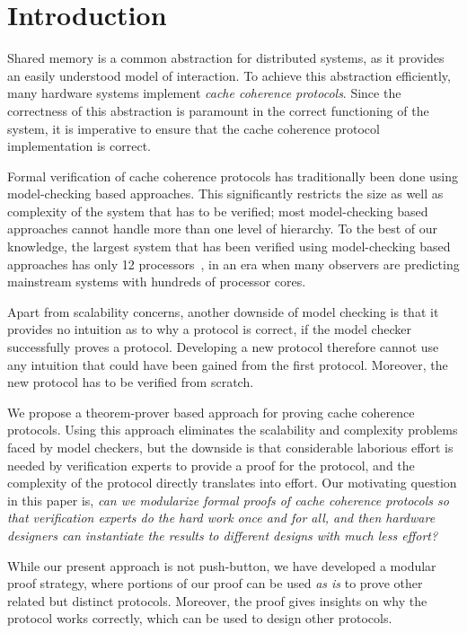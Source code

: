 \section{Introduction}
\label{sec:Introduction}

Shared memory is a common abstraction for distributed systems, as it provides
an easily understood model of interaction. To achieve this abstraction
efficiently, many hardware systems implement \emph{cache coherence protocols}.
Since the correctness of this abstraction is paramount in the correct
functioning of the system, it is imperative to ensure that the cache coherence
protocol implementation is correct.

Formal verification of cache coherence protocols has traditionally been done
using model-checking based approaches. This significantly restricts the size as
well as complexity of the system that has to be verified; most model-checking
based approaches cannot handle more than one level of hierarchy. To the best of
our knowledge, the largest system that has been verified using model-checking
based approaches has only 12 processors~\cite{Chen:2008:VHC:1559300}, in an era
when many observers are predicting mainstream systems with hundreds of processor
cores.

Apart from scalability concerns, another downside of model checking
is that it provides no intuition as to why a protocol is correct, if
the model checker successfully proves a protocol. Developing a new protocol
therefore cannot use any intuition that could have been gained from
the first protocol. Moreover, the new protocol has to be verified from scratch.

We propose a theorem-prover based approach for proving cache coherence
protocols. Using this approach eliminates the scalability and complexity
problems faced by model checkers, but the downside is that considerable
laborious effort is needed by verification experts to provide a proof for the
protocol, and the complexity of the protocol directly translates into effort.
Our motivating question in this paper is,
\emph{can we modularize formal proofs of cache coherence protocols so that
verification experts do the hard work once and for all, and then hardware
designers can instantiate the results to different designs with much less
effort?}

While our present approach is not push-button, we have developed a
modular proof strategy, where portions of our proof can be used \emph{as is} to
prove other related but distinct protocols. Moreover, the proof gives
insights on why the protocol works correctly, which can be used to design other
protocols.

